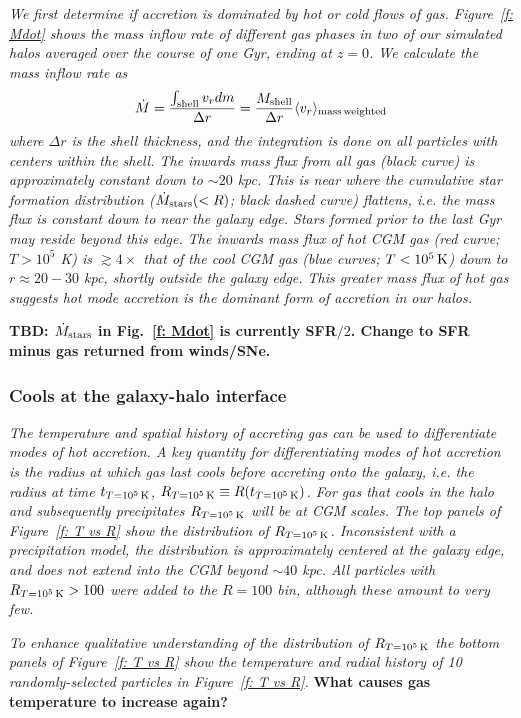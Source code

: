 \documentclass[fleqn,usenatbib]{mnras}
\newcommand{\Rcon}{R_{T=10^5\,{\rm K}}}
\newcommand{\tcon}{t_{T=10^5\,{\rm K}}}
\newcommand{\Mdot}{\dot{M}}
\begin{document}
\textit{
We first determine if accretion is dominated by hot or cold flows of gas.
Figure~\ref{f: Mdot} shows the mass inflow rate of different gas phases in two of our simulated halos averaged over the course of one Gyr, ending at $z=0$.
We calculate the mass inflow rate as
\begin{equation}\label{e: Mdot}
     \Mdot = \frac{\int_{\rm shell} v_r dm}{\Delta r} = \frac{M_{\rm shell}}{\Delta r} \langle v_r\rangle_{\rm mass\, weighted}
\end{equation}
where $\Delta r$ is the shell thickness, and the integration is done on all particles with centers within the shell.
The inwards mass flux from all gas (black curve) is approximately constant down to $\sim 20$ kpc.
This is near where the cumulative star formation distribution ($\dot M_{\rm stars}(<R)$; black dashed curve) flattens, i.e. the mass flux is constant down to near the galaxy edge.
Stars formed prior to the last Gyr may reside beyond this edge.
The inwards mass flux of hot CGM gas (red curve; $T>10^5$ K)  is $\gtrsim 4\times$ that of the cool CGM gas (blue curves; $T < 10^5\,{\rm K}$) down to $r \approx 20-30$ kpc, shortly outside the galaxy edge.
This greater mass flux of hot gas suggests hot mode accretion is the dominant form of accretion in our halos.
}

\textbf{TBD: $\dot{M}_{\rm stars}$ in Fig.~\ref{f: Mdot} is currently SFR$/2$. Change to SFR minus gas returned from winds/SNe.}


\subsubsection{Cools at the galaxy-halo interface}

\textit{
The temperature and spatial history of accreting gas can be used to differentiate modes of hot accretion.
A key quantity for differentiating modes of hot accretion is the radius at which gas last cools before accreting onto the galaxy, i.e. the radius at time $\tcon$, $\Rcon \equiv R (\tcon)$.
For gas that cools in the halo and subsequently precipitates $\Rcon$ will be at CGM scales.
The top panels of Figure~\ref{f: T vs R} show the distribution of  $\Rcon$.
Inconsistent with a precipitation model, the distribution is approximately centered at the galaxy edge, and does not extend into the CGM beyond $\sim 40$ kpc.
All particles with $\Rcon>100$  were added to the $R=100$ bin, although these amount to very few.
}

\textit{
To enhance qualitative understanding of the distribution of $\Rcon$ the bottom panels of Figure~\ref{f: T vs R} show the temperature and radial history of 10 randomly-selected particles in Figure~\ref{f: T vs R}.
}
\textbf{
What causes gas temperature to increase again?
}
\end{document}
